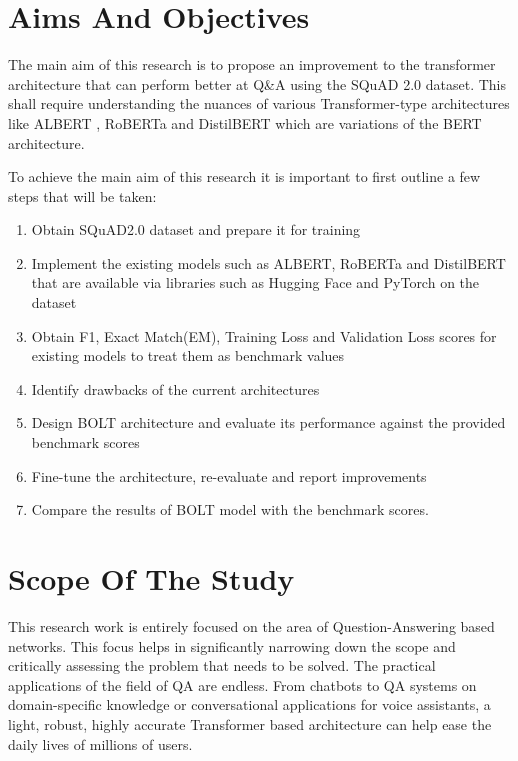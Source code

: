 \documentclass[a4paper,12pt]{report}
\begin{document}
        \section{Aims And Objectives}\label{12}
        	The main aim of this research is to propose an improvement to the transformer architecture that can perform better at Q\&A using the SQuAD 2.0 dataset. This shall require understanding the nuances of various Transformer-type architectures like ALBERT \citep{albert}, RoBERTa \citep{roberta} and DistilBERT \citep{distil} which are variations of the BERT \citep{bert} architecture.

        	To achieve the main aim of this research it  is important to first outline a few steps that will be taken:
        \begin{enumerate}
        	\item Obtain SQuAD2.0 dataset and prepare it for training
        	\item Implement the existing models such as ALBERT, RoBERTa and DistilBERT that are available via libraries such as Hugging Face \citep{hfTransformers} and PyTorch  on the dataset
        	\item Obtain F1, Exact Match(EM), Training Loss and Validation Loss scores for existing models to treat them as benchmark values
        	\item Identify drawbacks of the current architectures
        	\item Design BOLT architecture and evaluate its performance against the provided benchmark scores
        	\item Fine-tune the architecture, re-evaluate and report improvements
        	\item Compare the results of BOLT model with the benchmark scores.
        \end{enumerate}

        \section{Scope Of The Study}\label{13}

        This research work is entirely focused on the area of Question-Answering based networks. This focus helps in significantly narrowing down the scope and critically assessing the problem that needs to be solved. The practical applications of the field of QA are endless. From chatbots to QA systems on domain-specific knowledge or conversational applications for voice assistants, a light, robust, highly accurate Transformer based architecture can help ease the daily lives of millions of users.
\end{document}
